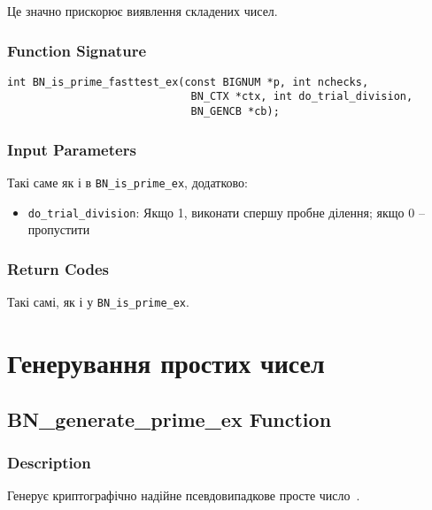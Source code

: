 Це значно прискорює виявлення складених чисел.

\subsubsection{Function Signature}
\begin{verbatim}
int BN_is_prime_fasttest_ex(const BIGNUM *p, int nchecks,
                             BN_CTX *ctx, int do_trial_division,
                             BN_GENCB *cb);
\end{verbatim}

\subsubsection{Input Parameters}
Такі саме як і в \texttt{BN\_is\_prime\_ex}, додатково:
\begin{itemize}
    \item \texttt{do\_trial\_division}: Якщо 1, виконати спершу пробне ділення; якщо 0 -- пропустити
\end{itemize}

\subsubsection{Return Codes}
Такі самі, як і у \texttt{BN\_is\_prime\_ex}.

\section{Генерування простих чисел}

\subsection{BN\_generate\_prime\_ex Function}

\subsubsection{Description}
Генерує криптографічно надійне псевдовипадкове просте число~\cite{menezes1996handbook}.

\newpage %
